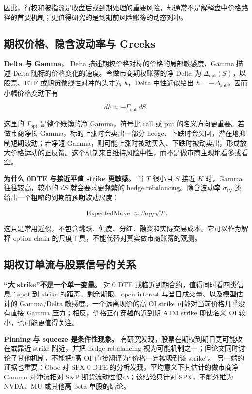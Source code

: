 因此，行权和被指派是收盘后或到期处理的重要风险，却通常不是解释盘中价格路径的首要机制；更值得研究的是到期前风险账簿的动态对冲。

\subsection{期权价格、隐含波动率与 Greeks}

\textbf{Delta 与 Gamma。} Delta 描述期权价格对标的价格的局部敏感度，Gamma 描述 Delta 随标的价格变化的速度。令做市商期权账簿的净 Delta 为 \(\Delta_{\mathrm{opt}}(S)\)，以股票、ETF 或期货做线性对冲的头寸为 \(h\)，Delta 中性近似给出 \(h=-\Delta_{\mathrm{opt}}\)。因而小幅价格变动下有

\[
dh \approx -\Gamma_{\mathrm{opt}}\,dS.
\]

这里的 \(\Gamma_{\mathrm{opt}}\) 是整个账簿的净 Gamma，符号比 call 或 put 的名义方向更重要。若做市商净长 Gamma，标的上涨时会卖出一部分 hedge、下跌时会买回，潜在地抑制短期波动；若净短 Gamma，则可能上涨时被动买入、下跌时被动卖出，形成放大价格运动的正反馈。这个机制来自维持风险中性，而不是做市商主观地看多或看空。

\textbf{为什么 0DTE 与接近平值 strike 更敏感。} 当 \(T\) 很小且 \(S\) 接近 \(K\) 时，Gamma 往往较高，较小的 \(dS\) 就会要求更频繁的 hedge rebalancing。隐含波动率 \(\sigma_{\mathrm{IV}}\) 还给出一个粗略的到期前预期波动尺度：

\[
\operatorname{ExpectedMove}\approx S\sigma_{\mathrm{IV}}\sqrt{T}.
\]

这只是常用近似，不包含跳跃、偏度、分红、融资和实际交易成本。它可以作为解释 option chain 的尺度工具，不能代替对真实做市商账簿的观测。

\subsection{期权订单流与股票信号的关系}

\textbf{“大 strike”不是一个单一变量。} 对 \(0\) DTE 或临近到期合约，值得同时看四类信息：spot 到 strike 的距离、剩余期限、open interest 与当日成交量、以及模型估计的 Gamma/Delta 敏感度。一个远离现价的高 OI strike 可能对当前价格几乎没有直接 Gamma 压力；相反，价格正在穿越的近到期 ATM strike 即使名义 OI 较小，也可能更值得关注。

\textbf{Pinning 与 squeeze 是条件性现象。} 有研究发现，股票在期权到期日更可能收在或靠近 strike 附近，并把 hedge rebalancing 视为可能机制之一；但论文同时讨论了其他机制，不能把“高 OI”直接翻译为“价格一定被吸到该 strike”。 另一端的证据也重要：Cboe 对 SPX \(0\) DTE 的分析发现，平均意义下其估计的做市商净 Gamma 对冲流相对 S\&P 期货流动性很小；该结论只针对 SPX，不能外推为 NVDA、MU 或其他高 beta 单股的结论。

